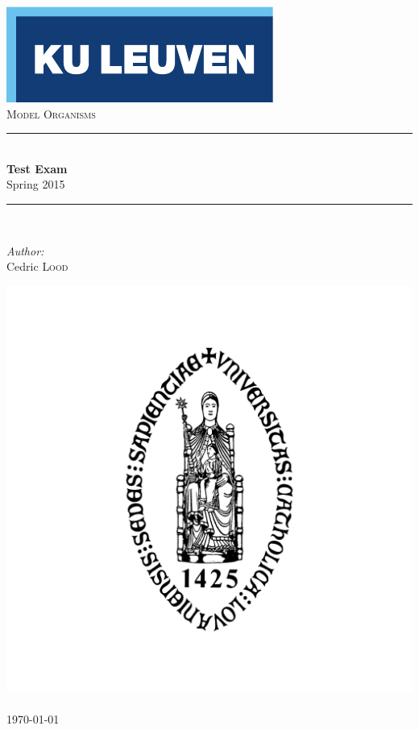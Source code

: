\begin{titlepage}
  \begin{center}
    
    \includegraphics[scale=1.5]{Figures/kuleuven_logo.pdf}~\\[4.5cm]
    
    \textsc{\Large Model Organisms}\\[0.5cm]
    
    \rule{\linewidth}{0.3mm}\\[0.4cm]
    {\huge \bfseries Test Exam} \\[0.4cm]
    {\large Spring 2015} \\[0.4cm]
    \rule{\linewidth}{0.3mm}\\[1.5cm]
    
    \begin{minipage}{0.4\textwidth}
      \begin{center} \large
        \emph{Author:}\\
        Cedric \textsc{Lood}\\
      \end{center}
    \end{minipage}
    
    \vfill
    
    \includegraphics[scale=0.15]{Figures/KUL.jpg}~\\[0.5cm]

    {\large \today}
    
  \end{center}
\end{titlepage}
